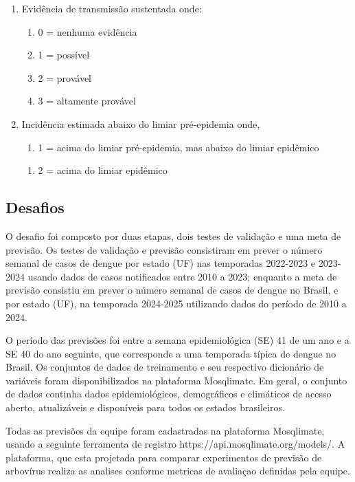 \begin{enumerate}
\begin{enumerate}
    \end{enumerate}
    \item Evidência de transmissão sustentada onde: 
    \begin{enumerate}
        \item 0 = nenhuma evidência
        \item 1 = possível
        \item  2 = provável
        \item 3 = altamente provável
    \end{enumerate}
    \item Incidência estimada abaixo do limiar pré-epidemia onde, 
    \begin{enumerate}
        \item 1 = acima do limiar pré-epidemia, mas abaixo do limiar epidêmico
    \end{enumerate}
    \begin{enumerate}
        \item 2 = acima do limiar epidêmico
    \end{enumerate}


\end{enumerate}


\subsection{Desafios}

O desafio foi composto por duas etapas, dois testes de validação e uma meta de previsão. Os testes de validação e previsão consistiram em prever o número semanal de casos de dengue por estado (UF) nas temporadas 2022-2023 e 2023-2024 usando dados de casos notificados entre 2010 a 2023; enquanto a meta de previsão consistiu em prever o número semanal de casos de dengue no Brasil, e por estado (UF), na temporada 2024-2025 utilizando dados do período de 2010 a 2024. 

O período das previsões foi entre a semana epidemiológica (SE) 41 de um ano e a SE 40 do ano seguinte, que corresponde a uma temporada típica de dengue no Brasil. Os conjuntos de dados de treinamento e seu respectivo dicionário de variáveis foram disponibilizados na plataforma Mosqlimate. Em geral, o conjunto de dados continha dados epidemiológicos, demográficos e climáticos de acesso aberto, atualizáveis e disponíveis para todos os estados brasileiros.

Todas as previsões da equipe foram cadastradas na plataforma Mosqlimate, usando a seguinte ferramenta de registro https://api.mosqlimate.org/models/.  A plataforma, que esta projetada para comparar experimentos de previsão de arbovírus realiza as analises conforme metricas de avaliaçao definidas pela equipe. 
 


